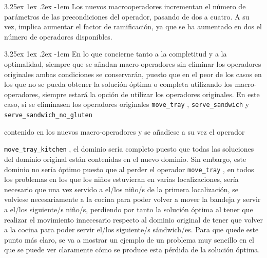 \documentclass{article}
\makeatletter
\newcommand{\cool}[1] {
        {\texttt{#1}}
    }
\renewcommand\paragraph{\@startsection{paragraph}{5}{\z@}%
      {3.25ex \@plus1ex \@minus.2ex}%
      {-1em}%
      {\normalfont\normalsize\bfseries}}
\makeatother
\begin{document}
    \paragraph{}
    Los nuevos macrooperadores incrementan el número de parámetros de las
    precondiciones del operador, pasando de dos a cuatro. A su vez, implica
    aumentar el factor de ramificación, ya que se ha aumentado en dos el número de
    operadores disponibles.
    
    \paragraph{}
    En lo que concierne tanto a la completitud y a la optimalidad, siempre que se
    añadan macro-operadores sin eliminar los operadores originales ambas
    condiciones se conservarán, puesto que en el peor de los casos en los que no se pueda
    obtener la solución óptima o completa utilizando los macro-operadores, siempre
    estará la opción de utilizar los operadores originales. En este caso, si se eliminasen
    los operadores originales \cool{move\_tray}, \cool{serve\_sandwich} y \cool{serve\_sandwich\_no\_gluten}
    contenido en los nuevos macro-operadores y se añadiese a su vez el operador
    \cool{move\_tray\_kitchen}, el dominio sería completo puesto que todas las soluciones
    del dominio original están contenidas en el nuevo dominio. Sin embargo, este
    dominio no sería óptimo puesto que al perder el operador \cool{move\_tray}, en todos
    los problemas en los que los niños estuvieran en varias localizaciones, sería
    necesario que una vez servido a el/los niño/s de la primera localización, se volviese
    necesariamente a la cocina para poder volver a mover la bandeja y servir a el/los
    siguiente/s niño/s, perdiendo por tanto la solución óptima al tener que realizar
    el movimiento innecesario respecto al dominio original de tener que volver a la
    cocina para poder servir el/los siguiente/s sándwich/es. Para que quede este
    punto más claro, se va a mostrar un ejemplo de un problema muy sencillo en
    el que se puede ver claramente cómo se produce esta pérdida de la solución
    óptima.
    
\end{document}
